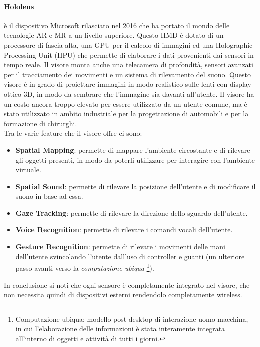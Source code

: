         \paragraph{Hololens} è il dispositivo Microsoft rilasciato nel 2016 che ha portato il mondo delle tecnologie 
            AR e MR a un livello superiore. Questo HMD è dotato di un processore di fascia alta, una GPU per il calcolo
            di immagini ed una Holographic Processing Unit (HPU) che permette di elaborare i dati provenienti dai sensori
            in tempo reale. Il visore monta anche una telecamera di profondità, sensori avanzati per il tracciamento dei
            movimenti e un sistema di rilevamento del suono. Questo visore è in grado di proiettare immagini in modo
            realistico sulle lenti con display ottico 3D, in modo da sembrare che l'immagine sia davanti all'utente.
            Il visore ha un costo ancora troppo elevato per essere utilizzato da un utente comune, ma è stato utilizzato
            in ambito industriale per la progettazione di automobili e per la formazione di chirurghi. \\
            Tra le varie feature che il visore offre ci sono:
            \begin{itemize}
                \item \textbf{Spatial Mapping}: permette di mappare l'ambiente circostante e di rilevare gli oggetti
                    presenti, in modo da poterli utilizzare per interagire con l'ambiente virtuale.
                \item \textbf{Spatial Sound}: permette di rilevare la posizione dell'utente e di modificare il suono in base
                    ad essa.
                \item \textbf{Gaze Tracking}: permette di rilevare la direzione dello sguardo dell'utente.
                \item \textbf{Voice Recognition}: permette di rilevare i comandi vocali dell'utente.
                \item \textbf{Gesture Recognition}: permette di rilevare i movimenti delle mani dell'utente svincolando
                    l'utente dall'uso di controller e guanti (un ulteriore passo avanti verso la \textit{computazione ubiqua}
                    \footnote{Computazione ubiqua: modello post-desktop di interazione uomo-macchina, in cui l'elaborazione
                    delle informazioni è stata interamente integrata all'interno di oggetti e attività di tutti i giorni.\cite{ubiCompWiki}}).
            \end{itemize}
            In conclusione si noti che ogni sensore è completamente integrato nel visore, che non necessita quindi di
            dispositivi esterni rendendolo completamente wireless.

